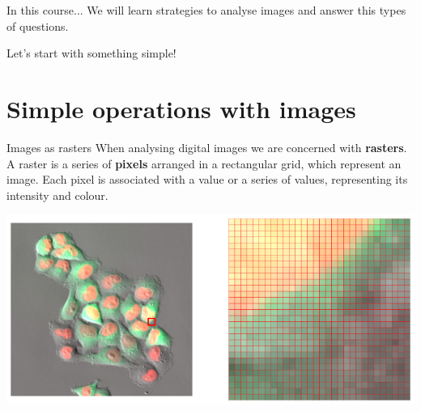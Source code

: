 \documentclass[9pt, aspectratio=169]{beamer}
\begin{document}
\begin{frame}
    {In this course...}
    \centering
    \Large
    We will learn strategies to analyse images and answer this types of questions.

    Let's start with something simple!

\end{frame}

\section{Simple operations with images}

\begin{frame}
{Images as rasters}
When analysing digital images we are concerned with \textbf{rasters}.\\
A raster is a series of \textbf{pixels} arranged in a rectangular grid, which represent an image. Each pixel is associated with a value or a series of values, representing its intensity and colour.
\begin{center}
    \includegraphics[width=.8\textwidth]{raster.png}
\end{center}
\end {frame}
\end{document}
